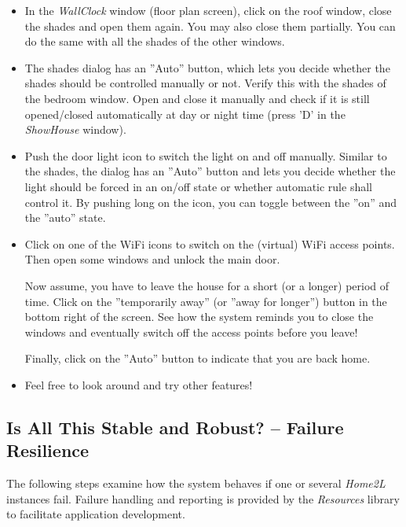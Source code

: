 \documentclass[12pt,english,parskip=half,headheight=19pt]{scrreprt}
\begin{document}
\begin{itemize}[$\blacktriangleright$]

  \item
    In the \textit{WallClock} window (floor plan screen), click on the roof window, close
    the shades and open them again. You may also close them partially. You can do the same
    with all the shades of the other windows.

  \item
    The shades dialog has an ''Auto'' button, which lets you decide whether the shades should
    be controlled manually or not. Verify this with the shades of the bedroom window.
    Open and close it manually and check if it is still opened/closed automatically at
    day or night time (press 'D' in the \textit{ShowHouse} window).

  \item
    Push the door light icon to switch the light on and off manually. Similar to the shades,
    the dialog has an ''Auto'' button and lets you decide whether the light should be forced in an 
    on/off state or whether automatic rule shall control it. By pushing long on the icon, 
    you can toggle between the ''on'' and the ''auto'' state.

  \item
    Click on one of the WiFi icons to switch on the (virtual) WiFi access points.
    Then open some windows and unlock the main door.

    Now assume, you have to leave the house for a short (or a longer) period of time.
    Click on the ''temporarily away'' (or ''away for longer'') button in the bottom right
    of the screen. See how the system reminds you to close the windows and eventually
    switch off the access points before you leave!

    Finally, click on the ''Auto'' button to indicate that you are back home.

  \item
    Feel free to look around and try other features!

\end{itemize}


\subsection{Is All This Stable and Robust? -- Failure Resilience}
\label{sec:tutorial-firststeps-robust}

The following steps examine how the system behaves if one or several \textit{Home2L} instances fail. Failure handling and reporting is provided by the \textit{Resources} library to facilitate application development.
\end{document}
